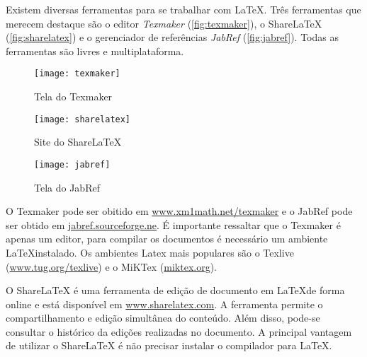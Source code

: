 Existem diversas ferramentas para se trabalhar com \LaTeX. Três ferramentas que merecem destaque são o editor \textit{Texmaker} (\autoref{fig:texmaker}), o ShareLaTeX (\autoref{fig:sharelatex}) e o gerenciador de referências \textit{JabRef} (\autoref{fig:jabref}). Todas as ferramentas são livres e multiplataforma. 

\begin{figure}[htb]
\caption{Tela do Texmaker}
 \label{fig:texmaker}
 \centering
 \texttt{[image: texmaker]}
 \fautor
\end{figure}

\begin{figure}[htb]
\caption{Site do ShareLaTeX}
 \label{fig:sharelatex}
 \centering
 \texttt{[image: sharelatex]}
 \fautor
\end{figure}

\begin{figure}[htb]
 \caption{Tela do JabRef}
 \label{fig:jabref}
 \centering
 \texttt{[image: jabref]}
\fautor
\end{figure}

O Texmaker pode ser obitido em \url{www.xm1math.net/texmaker} e o JabRef pode ser obtido em \url{jabref.sourceforge.ne}. É importante ressaltar que o Texmaker é apenas um editor, para compilar os documentos é necessário um ambiente \LaTeX instalado. Os ambientes Latex mais populares são o Texlive (\url{www.tug.org/texlive}) e o MiKTex (\url{miktex.org}).

O ShareLaTeX é uma ferramenta de edição de documento em \LaTeX de forma online e está disponível em \url{www.sharelatex.com}. A ferramenta permite o compartilhamento e edição simultânea do conteúdo. Além disso, pode-se consultar o histórico da edições realizadas no documento. A principal vantagem de utilizar o ShareLaTeX é não precisar instalar o compilador para LaTeX.